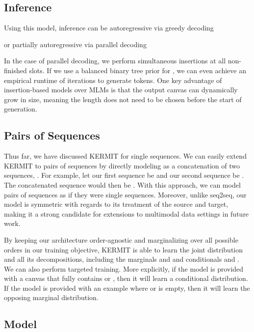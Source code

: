 \documentclass{article}
\begin{document}
\subsection{Inference}
Using this model, inference can be autoregressive via greedy decoding

or partially autoregressive via parallel decoding

In the case of parallel decoding, we perform simultaneous insertions at all non-finished slots. If we use a balanced binary tree prior for  \citep{stern-icml-2019}, we can even achieve an empirical runtime of  iterations to generate  tokens. One key advantage of insertion-based models over MLMs is that the output canvas can dynamically grow in size, meaning the length does not need to be chosen before the start of generation.

\subsection{Pairs of Sequences}
Thus far, we have discussed KERMIT for single sequences. We can easily extend KERMIT to pairs of sequences by directly modeling  as a concatenation of two sequences, . For example, let our first sequence be  and our second sequence be . The concatenated sequence would then be .
With this approach, we can model pairs of sequences as if they were single sequences. Moreover, unlike seq2seq, our model is symmetric with regards to its treatment of the source and target, making it a strong candidate for extensions to multimodal data settings in future work.

By keeping our architecture order-agnostic and marginalizing over all possible orders in our training objective, KERMIT is able to learn the joint distribution and all its decompositions, including the marginals  and  and conditionals  and . We can also perform targeted training. More explicitly, if the model is provided with a canvas that fully contains  or , then it will learn a conditional distribution. If the model is provided with an example where  or  is empty, then it will learn the opposing marginal distribution.

\subsection{Model}
\end{document}
